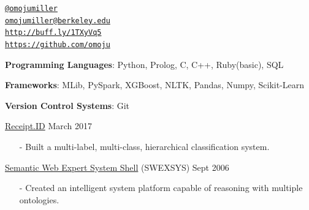 \documentclass[11pt,article,oneside]{memoir}
\makeatletter
\def\myemail{omojumiller@berkeley.edu}
\def\mytwitter{@omojumiller}
\def\mylinkedin{http://buff.ly/1TXyVq5}
\def\mygithub{https://github.com/omoju}
\makeatother
\begin{document}
\begin{minipage}[t]{2.95in}
  
\end{minipage}
\hfill     
\hfill
\begin{minipage}[t]{2.6in}
  \flushright \footnotesize  \addressblock 
  {\scriptsize  \texttt{\href{http://twitter.com/omojumiller}{\mytwitter}} \, \faTwitter }  \\ 
  {\scriptsize  \texttt{\href{mailto:\myemail}{\myemail}} \, \faEnvelope} \\
  {\scriptsize  \texttt{\href{\mylinkedin}{\mylinkedin}} \, \faLinkedin} \\
  {\scriptsize  \texttt{\href{\mygithub}{\mygithub}} \, \faGithub} 
\end{minipage}

\medskip


\bigskip       
{}
\reversemarginpar

\medskip

\ind \textbf{Programming Languages}: Python, Prolog, C, C++, Ruby(basic), SQL

\ind \textbf{Frameworks}: MLib, PySpark, XGBoost, NLTK, Pandas, Numpy, Scikit-Learn

\ind \textbf{Version Control Systems}: Git
\bigskip 

\medskip

\ind \href{https://github.com/omoju/receiptdID}{Receipt.ID} \hfill March 2017 
\begin{itemize}[noitemsep,nolistsep]
\item[-] Built a multi-label, multi-class, hierarchical classification system.
\end{itemize}

\ind \href{https://github.com/omoju/SWEXSYS}{Semantic Web Expert System Shell} (SWEXSYS) \hfill Sept 2006 
\begin{itemize}[noitemsep,nolistsep]
\item[-] Created an intelligent system platform capable of reasoning with multiple ontologies.
\end{itemize} 
\end{document}
